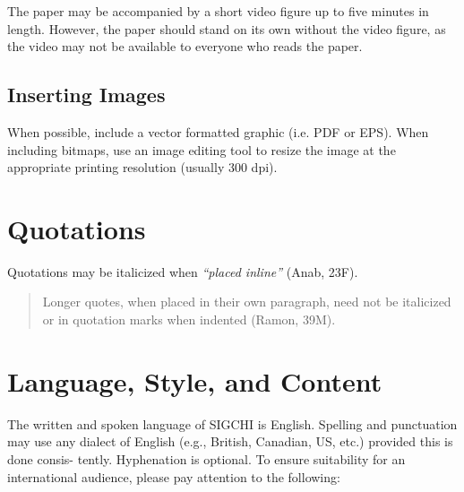 \documentclass{sigchi}
\begin{document}
The paper may be accompanied by a short video figure up to five
minutes in length. However, the paper should stand on its own without
the video figure, as the video may not be available to everyone who
reads the paper.  

\subsection{Inserting Images}
When possible, include a vector formatted graphic (i.e. PDF or EPS).
When including bitmaps,  use an image editing tool to resize the image
at the appropriate printing resolution (usually 300 dpi).

\section{Quotations}
Quotations may be italicized when \textit{``placed inline''} (Anab,
23F).

\begin{quote}
Longer quotes, when placed in their own paragraph, need not be
italicized or in quotation marks when indented (Ramon, 39M).  
\end{quote}

\section{Language, Style, and Content}

The written and spoken language of SIGCHI is English. Spelling and
punctuation may use any dialect of English (e.g., British, Canadian,
US, etc.) provided this is done consis- tently. Hyphenation is
optional. To ensure suitability for an international audience, please
pay attention to the following:
\end{document}
